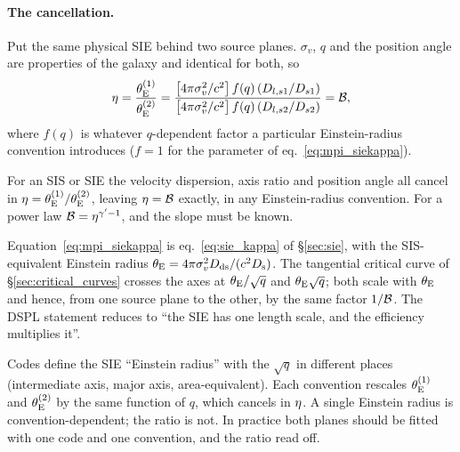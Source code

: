 \paragraph{The cancellation.}  Put the same physical SIE behind two
source planes.  $\sigma_v$, $q$ and the position angle are properties of
the galaxy and identical for both, so
\begin{equation}
  \eta=\frac{\theta_{\mathrm{E}}^{(1)}}{\theta_{\mathrm{E}}^{(2)}}
  =\frac{\big[4\pi\sigma_v^2/c^2\big]\,f(q)\,(D_{l,s1}/D_{s1})}
        {\big[4\pi\sigma_v^2/c^2\big]\,f(q)\,(D_{l,s2}/D_{s2})}
  =\mathcal{B} ,
  \label{eq:mpi_sieratio}
\end{equation}
where $f(q)$ is whatever $q$-dependent factor a particular Einstein-radius
convention introduces ($f=1$ for the parameter of
eq.~\eqref{eq:mpi_siekappa}).  

\begin{keybox}
For an SIS or SIE the velocity dispersion, axis ratio and position angle
all cancel in $\eta=\theta_{\mathrm{E}}^{(1)}/\theta_{\mathrm{E}}^{(2)}$, leaving
$\eta=\mathcal{B}$ exactly, in any Einstein-radius convention.  For a power
law $\mathcal{B}=\eta^{\gamma'-1}$, and the slope must be known.
\end{keybox}

\begin{bridge}
Equation~\eqref{eq:mpi_siekappa} is eq.~\eqref{eq:sie_kappa} of
\S\ref{sec:sie}, with the SIS-equivalent Einstein radius
$\theta_{\mathrm{E}}=4\pi\sigma_v^2D_{\mathrm{ds}}/(c^2D_{\mathrm{s}})$.  The tangential critical curve of
\S\ref{sec:critical_curves} crosses the axes at $\theta_{\mathrm{E}}/\sqrt{q}$ and
$\theta_{\mathrm{E}}\sqrt{q}$; both scale with $\theta_{\mathrm{E}}$ and hence, from one source
plane to the other, by the same factor $1/\mathcal{B}$.  The DSPL statement
reduces to ``the SIE has one length scale, and the efficiency multiplies
it''.
\end{bridge}

\begin{annotation}
Codes define the SIE ``Einstein radius'' with the $\sqrt{q}$ in
different places (intermediate axis, major axis, area-equivalent).  Each
convention rescales $\theta_{\mathrm{E}}^{(1)}$ and $\theta_{\mathrm{E}}^{(2)}$ by the same
function of $q$, which cancels in $\eta$.  A single Einstein radius is
convention-dependent; the ratio is not.  In practice both
planes should be fitted with one code and one convention, and the ratio
read off.
\end{annotation}


